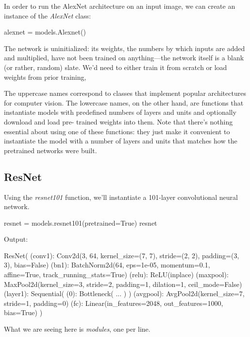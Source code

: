 In order to run the AlexNet architecture on an input image, we can create an instance of the \textsl{AlexNet} class:

\begin{python}
alexnet = models.Alexnet()
\end{python}

The network is uninitialized: its weights, the numbers by which inputs are added and multiplied, have not been trained on anything—the network itself is a blank (or rather, random) slate. We’d need to either train it from scratch or load weights from prior training, 

The uppercase names correspond to classes that implement popular architectures for computer vision. The lowercase names, on the other hand, are functions that instantiate models with predefined numbers of layers and units and optionally download and load pre-
trained weights into them. Note that there’s nothing essential about using one of these functions: they just make it convenient to instantiate the model with a number of layers and units that matches how the pretrained networks were built.

\subsection*{ResNet}

Using the \textsl{resnet101} function, we’ll instantiate a 101-layer convolutional neural network.

\begin{python}
resnet = models.resnet101(pretrained=True)
resnet
\end{python}

Output:

\begin{python}
ResNet(
    (conv1): Conv2d(3, 64, kernel_size=(7, 7), stride=(2, 2), padding=(3, 3),
                    bias=False)
    (bn1): BatchNorm2d(64, eps=1e-05, momentum=0.1, affine=True,
                        track_running_stats=True)
    (relu): ReLU(inplace)
    (maxpool): MaxPool2d(kernel_size=3, stride=2, padding=1, dilation=1,
                        ceil_mode=False)
    (layer1): Sequential(
        (0): Bottleneck(
    ...
        )
    )
    (avgpool): AvgPool2d(kernel_size=7, stride=1, padding=0)
    (fc): Linear(in_features=2048, out_features=1000, bias=True)
)
\end{python}

What we are seeing here is \textsl{modules}, one per line.

